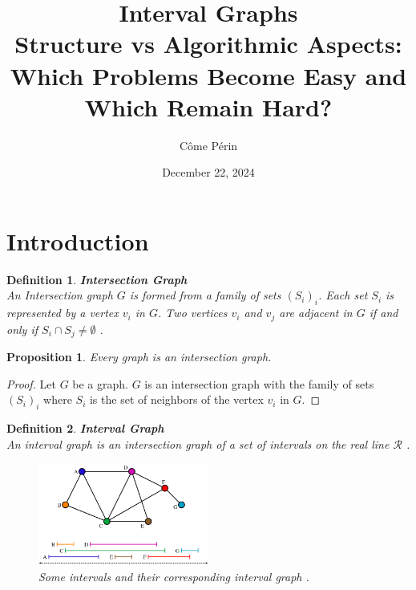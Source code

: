 \documentclass{article}
\title{\textbf{Interval Graphs}\\
\large Structure vs Algorithmic Aspects:\\
Which Problems Become Easy and Which Remain Hard?}
\author{Côme Périn}
\newtheorem{definition}{Definition}[section]
\newtheorem{proposition}{Proposition}[section]
\begin{document}
\date{December 22, 2024}
\maketitle

\section{Introduction}

\begin{definition}
    \textbf{Intersection Graph} \\
    An Intersection graph $G$ is formed from a family of sets $(S_i)_i$. 
    Each set $S_i$ is represented by a vertex $v_i$ in $G$. 
    Two vertices $v_i$ and $v_j$ are adjacent in $G$ 
    if and only if $S_i \cap S_j \neq \emptyset$ \cite{erdos}. 
\end{definition}

\begin{proposition}
    Every graph is an intersection graph.
\end{proposition}

\begin{proof}
    Let $G$ be a graph. $G$ is an intersection graph with the family of sets 
    $(S_i)_i$ where $S_i$ is the set of neighbors of the vertex $v_i$ in $G$.
\end{proof}

\begin{definition}
    \textbf{Interval Graph} \\ 
    An interval graph is an intersection graph of a 
    set of intervals on the real line $\mathcal{R}$ \cite{golumbic}.

    \begin{figure}[h]
        \centering
        \includegraphics[width=0.5\textwidth]{rsc/interval_graph.png}
        \caption{Some intervals and their corresponding interval graph \cite{wiki_interval}.}
        \label{figure:interval_graph}
    \end{figure}
\end{definition}
\end{document}
